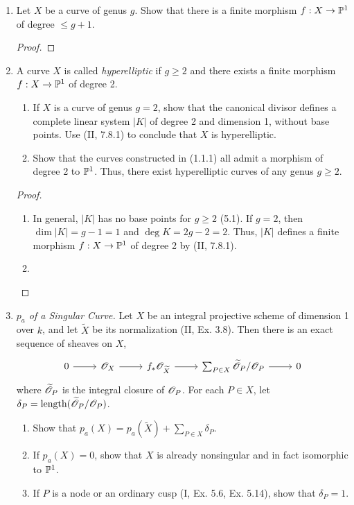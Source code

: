 \documentclass{article}
\begin{document}
\begin{enumerate} [label=\textbf{\arabic*.}, leftmargin=0em]
\item Let $X$ be a curve of genus $g$.
Show that there is a finite morphism $f : X \to \mathbb{P}^1$ of degree $\leq g + 1$.

\begin{proof}
\end{proof}

\item A curve $X$ is called \textit{hyperelliptic} if $g \geq 2$ and there exists a finite morphism $f : X \to \mathbb{P}^1$ of degree 2.
\begin{enumerate} [label=(\alph*)]
  \item If $X$ is a curve of genus $g = 2$, show that the canonical divisor defines a complete linear system $|K|$ of degree 2 and dimension 1, without base points. Use (II, 7.8.1) to conclude that $X$ is hyperelliptic.
  \item Show that the curves constructed in (1.1.1) all admit a morphism of degree 2 to $\mathbb{P}^1$. Thus, there exist hyperelliptic curves of any genus $g \geq 2$.
\end{enumerate}

\begin{proof} $ $ \vspace{0pt}
  \begin{enumerate} [label=(\alph*), leftmargin=0cm]
    \item In general, $|K|$ has no base points for $g \geq 2$ (5.1).
    If $g = 2$, then $\dim|K| = g - 1 = 1$ and $\deg{K} = 2g - 2 = 2$. Thus, $|K|$ defines a finite morphism $f : X \to \mathbb{P}^1$ of degree 2 by (II, 7.8.1).
    \item 
  \end{enumerate}
\end{proof}

\item \textit{$p_a$ of a Singular Curve.} Let $X$ be an integral projective scheme of dimension 1 over $k$, and let $\widetilde{X}$ be its normalization (II, Ex. 3.8). Then there is an exact sequence of sheaves on $X$,
\[ \begin{tikzcd}
  0 \arrow[r] & \fO_X \arrow[r] & f_*\fO_{\widetilde{X}} \arrow[r] & \sum_{P \in X} \widetilde{\fO}_P/\fO_P \arrow[r] & 0
  \end{tikzcd} \]
where $\widetilde{\mathscr{O}}_P$ is the integral closure of $\mathscr{O}_P$. For each $P \in X$, let $\delta_P = \operatorname{length}(\widetilde{\mathscr{O}}_P/\mathscr{O}_P)$.
\begin{enumerate} [label=(\alph*)]
  \item Show that $p_a(X) = p_a(\widetilde{X}) + \sum_{P \in X} \delta_P$.
  \item If $p_a(X) = 0 $, show that $X$ is already nonsingular and in fact isomorphic to $\mathbb{P}^1$.
  \item If $P$ is a node or an ordinary cusp (I, Ex. 5.6, Ex. 5.14), show that $\delta_P = 1$.
\end{enumerate}


\end{enumerate}
\end{document}
